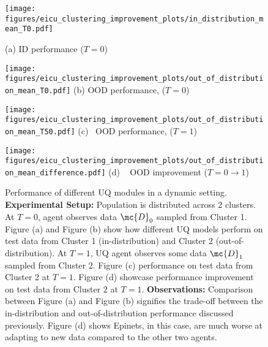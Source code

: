 


\begin{figure}[h]
\centering
\begin{minipage}[b]{0.24\textwidth}
\centering
\texttt{[image: figures/eicu\_clustering\_improvement\_plots/in\_distribution\_mean\_T0.pdf]}

{\small{{(a)} ID performance ($T=0$) }}
\end{minipage}
\hfill
\begin{minipage}[b]{0.24\textwidth}
\centering \texttt{[image: figures/eicu\_clustering\_improvement\_plots/out\_of\_distribution\_mean\_T0.pdf]}
{\small{{(b)} OOD performance, ($T=0$) }}
\end{minipage}
\hfill
\begin{minipage}[b]{0.24\textwidth}
\centering \texttt{[image: figures/eicu\_clustering\_improvement\_plots/out\_of\_distribution\_mean\_T50.pdf]}
{\small{{(c)}~ OOD performance, ($T=1$)}}
\label{fig:eicu_clustering_improvement-k=30}
\end{minipage}
\hfill
\begin{minipage}[b]{0.24\textwidth}
\centering \texttt{[image: figures/eicu\_clustering\_improvement\_plots/out\_of\_distribution\_mean\_difference.pdf]}
{\small{{(d)} ~ OOD improvement ($T=0 \to 1$) }}
\end{minipage}
\caption{Performance of different UQ modules in a dynamic setting. \textbf{Experimental Setup:} Population is distributed across 2 clusters.  At $T=0$, agent  observes data $\mc{D}_0$ sampled from Cluster 1. 
Figure (a) and Figure (b) show how different UQ models perform on test data from Cluster 1 (in-distribution) and Cluster 2 (out-of-distribution). At $T=1$, UQ agent observes some data $\mc{D}_1$  sampled from Cluster 2.  Figure (c) performance on test data from Cluster 2 at $T=1$. Figure (d)  showcase performance improvement on test data from Cluster 2 at $T=1$. \textbf{Observations:} Comparison between Figure (a) and Figure (b) signifies the trade-off between  the  in-distribution and out-of-distribution performance discussed previously. Figure (d) shows Epinets, in this case, are much worse at adapting to new data compared to the other two agents.}
\label{fig:dynamic_setting_k_30}
\end{figure}



